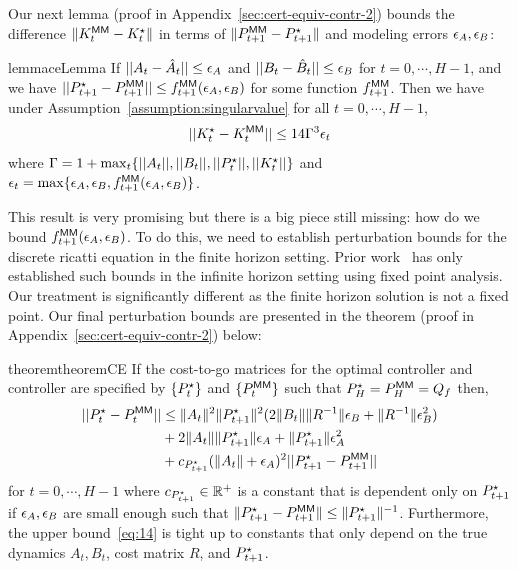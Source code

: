 Our next
lemma (proof in Appendix~\ref{sec:cert-equiv-contr-2}) bounds the difference $\|K^\mathsf{MM}_t - K^\star_t\|$ in terms of
$\|P^\mathsf{MM}_{t+1} - P^\star_{t+1}\|$ and modeling errors $\epsilon_A, \epsilon_B$:
\begin{restatable}{lemma}{ceLemma}
  \label{lemma:ce}
  If $||A_{t} - \hat{A}_{t}|| \leq \epsilon_A$ and
  $||B_{t} - \hat{B}_{t}|| \leq \epsilon_B$ for $t=0, \cdots, H-1$, and we have
  $||P^\star_{t+1} - P^\mathsf{MM}_{t+1}|| \leq f^\mathsf{MM}_{t+1}(\epsilon_A, \epsilon_B)$ for some function
  $f^\mathsf{MM}_{t+1}$. Then we have under
  Assumption~\ref{assumption:singularvalue} for all $t=0, \cdots, H-1$,
  \begin{align}
    ||K^\star_{t} - K^\mathsf{MM}_{t}|| \leq 14\Gamma^3\epsilon_t
    \label{eq:ce-k-diff}
  \end{align}
  where
  $\Gamma = 1 + \max_{t}\{||A_{t}||, ||B_{t}||, ||P^\star_{t}||, ||K^\star_{t}||\}$
  and $\epsilon_{t} = \max\{\epsilon_A, \epsilon_B, f^\mathsf{MM}_{t+1}(\epsilon_A, \epsilon_B)\}$.
\end{restatable}
This result is very promising but there is a big piece still missing: how do we
bound $f^\mathsf{MM}_{t+1}(\epsilon_A, \epsilon_B)$. To do this, we need to establish perturbation
bounds for the discrete ricatti equation in the finite
horizon setting. Prior work~\cite{konstantinov93, mania19} has only established such
bounds in the infinite horizon setting using fixed point analysis. Our treatment
is significantly different as the finite horizon solution is not a fixed point.
Our final perturbation bounds are presented in the theorem (proof in
Appendix~\ref{sec:cert-equiv-contr-2}) below:
\begin{restatable}{theorem}{theoremCE}
  \label{theorem:ce}
  If the cost-to-go matrices for the optimal controller and \MM{}
  controller are specified by $\{P^\star_t\}$ and $\{P^\mathsf{MM}_t\}$ such that
  $P^\star_H = P^\mathsf{MM}_H = Q_f$ then,
  \begin{align}
    \label{eq:14}
    ||P^\star_{t} - P^\mathsf{MM}_{t}|| &\leq  \|A_{t}\|^{2}\|P^\star_{t+1}\|^{2}(2\|B_{t}\|\|R^{-1}\|\epsilon_B + \|R^{-1}\|\epsilon_B^{2}) \nonumber\\
    &+ 2\|A_{t}\|\|P^\star_{t+1}\|\epsilon_A + \|P^\star_{t+1}\|\epsilon_A^{2} \nonumber\\
                        &+ c_{P^\star_{t+1}}(\|A_{t}\|+ \epsilon_A)^{2}||P^\star_{t+1} - P^\mathsf{MM}_{{t+1}}||
  \end{align}
  for $t=0, \cdots, H-1$ where $c_{P^\star_{t+1}} \in \mathbb{R}^+$  is a constant that is
  dependent only on $P^\star_{t+1}$ if $\epsilon_A, \epsilon_B$ are small enough such
  that $\|P^\star_{t+1} - P^\mathsf{MM}_{t+1}\| \leq \|P^\star_{t+1}\|^{-1}$. Furthermore, the upper
  bound~\eqref{eq:14} is tight up to constants that only depend on the
  true dynamics $A_t, B_t$, cost matrix $R$, and $P^\star_{t+1}$.
\end{restatable}

